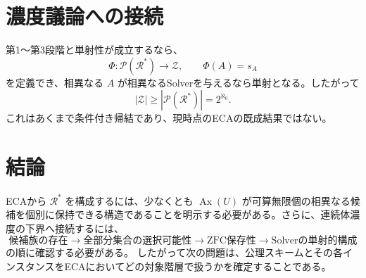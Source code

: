 \documentclass[11pt,a4paper]{article}
\begin{document}
\section{濃度議論への接続}
第1～第3段階と単射性が成立するなら、
\[
\Phi:\mathcal P(\mathcal R^*)\to\mathcal Z,\qquad \Phi(A)=s_A
\]
を定義でき、相異なる $A$ が相異なるSolverを与えるなら単射となる。したがって
\[
|\mathcal Z|\ge|\mathcal P(\mathcal R^*)|=2^{\aleph_0}.
\]
これはあくまで条件付き帰結であり、現時点のECAの既成結果ではない。

\section{結論}
ECAから $\mathcal R^*$ を構成するには、少なくとも $\operatorname{Ax}(U)$ が可算無限個の相異なる候補を個別に保持できる構造であることを明示する必要がある。さらに、連続体濃度の下界へ接続するには、
\[
\boxed{\text{候補族の存在}\to\text{全部分集合の選択可能性}\to\text{ZFC保存性}\to\text{Solverの単射的構成}}
\]
の順に確認する必要がある。
したがって次の問題は、公理スキームとその各インスタンスをECAにおいてどの対象階層で扱うかを確定することである。
\end{document}
